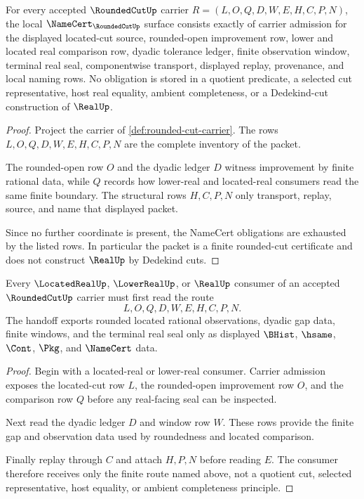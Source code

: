 \begin{theorem}
\label{thm:rounded-cut-namecert-obligations}
For every accepted $\RoundedCutUp$ carrier $R=(L,O,Q,D,W,E,H,C,P,N)$, the local $\NameCert_{\RoundedCutUp}$ surface consists exactly of carrier admission for the displayed located-cut source, rounded-open improvement row, lower and located real comparison row, dyadic tolerance ledger, finite observation window, terminal real seal, componentwise transport, displayed replay, provenance, and local naming rows. No obligation is stored in a quotient predicate, a selected cut representative, host real equality, ambient completeness, or a Dedekind-cut construction of $\RealUp$.
\end{theorem}
\begin{proof}
Project the carrier of \autoref{def:rounded-cut-carrier}. The rows $L,O,Q,D,W,E,H,C,P,N$ are the complete inventory of the packet.

The rounded-open row $O$ and the dyadic ledger $D$ witness improvement by finite rational data, while $Q$ records how lower-real and located-real consumers read the same finite boundary. The structural rows $H,C,P,N$ only transport, replay, source, and name that displayed packet.

Since no further coordinate is present, the NameCert obligations are exhausted by the listed rows. In particular the packet is a finite rounded-cut certificate and does not construct $\RealUp$ by Dedekind cuts.
\end{proof}

\begin{theorem}
\label{thm:rounded-cut-located-real-handoff}
Every $\LocatedRealUp$, $\LowerRealUp$, or $\RealUp$ consumer of an accepted $\RoundedCutUp$ carrier must first read the route
$$
L,O,Q,D,W,E,H,C,P,N.
$$
The handoff exports rounded located rational observations, dyadic gap data, finite windows, and the terminal real seal only as displayed $\BHist$, $\hsame$, $\Cont$, $\Pkg$, and $\NameCert$ data.
\end{theorem}
\begin{proof}
Begin with a located-real or lower-real consumer. Carrier admission exposes the located-cut row $L$, the rounded-open improvement row $O$, and the comparison row $Q$ before any real-facing seal can be inspected.

Next read the dyadic ledger $D$ and window row $W$. These rows provide the finite gap and observation data used by roundedness and located comparison.

Finally replay through $C$ and attach $H,P,N$ before reading $E$. The consumer therefore receives only the finite route named above, not a quotient cut, selected representative, host equality, or ambient completeness principle.
\end{proof}

